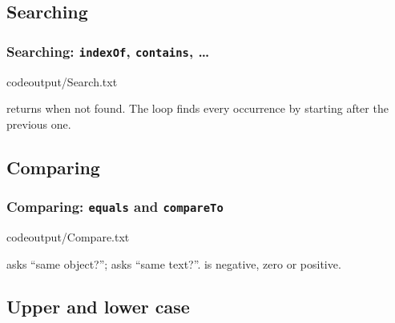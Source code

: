 \documentclass[aspectratio=169,10pt,compress]{beamer}
\begin{document}
\subsection[Search]{Searching}




\begin{frame}[t,fragile] \frametitle{Searching: \texttt{indexOf}, \texttt{contains}, \dots}
	\vspace{-0.2cm}
			{codeoutput/Search.txt}

	\vspace{0.3em}
	\small 
	 returns  when not found. 
	The loop finds every occurrence by starting after the previous one.
\end{frame}




\subsection[Compare]{Comparing}




\begin{frame}[t,fragile] \frametitle{Comparing: \texttt{equals} and \texttt{compareTo}}
			{codeoutput/Compare.txt}

	\vspace{0.3em}
	\small 
	\hCode{==} asks ``same object?''; 
	 asks ``same text?''. 
	 is negative, zero or positive.
\end{frame}




\subsection[Case]{Upper and lower case}
\end{document}
